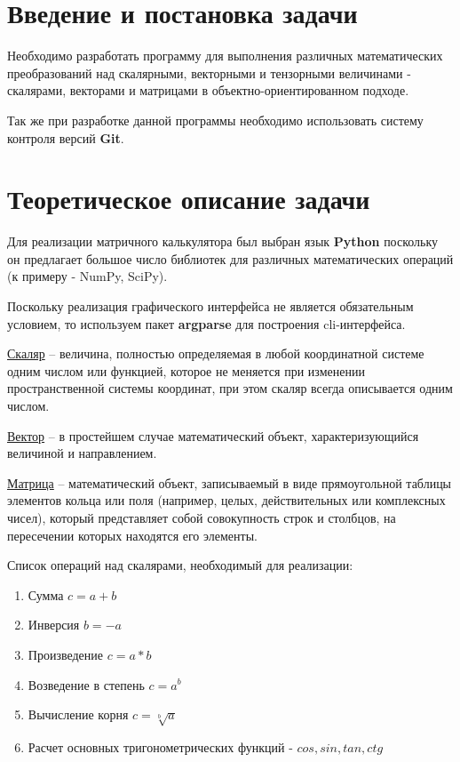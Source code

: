 \documentclass[a4paper,14pt]{extarticle}
\begin{document}
\section{Введение и постановка задачи}
Необходимо разработать программу для выполнения различных математических преобразований над скалярными, векторными и тензорными величинами - скалярами, векторами и матрицами в объектно-ориентированном подходе.

Так же при разработке данной программы необходимо использовать систему контроля версий \textbf{Git}.

\section{Теоретическое описание задачи}
Для реализации матричного калькулятора был выбран язык \textbf{Python} поскольку он предлагает большое число библиотек для различных математических операций (к примеру - NumPy, SciPy).

Поскольку реализация графического интерфейса не является обязательным условием, 
то используем пакет \textbf{argparse} для построения cli-интерфейса. 

\href{https://ru.wikipedia.org/wiki/%D0%A1%D0%BA%D0%B0%D0%BB%D1%8F%D1%80}{Скаляр} 
-- величина, полностью определяемая в любой координатной системе одним числом или функцией, которое не меняется при изменении пространственной системы координат, при этом скаляр всегда описывается одним числом.

\href{https://ru.wikipedia.org/wiki/%D0%92%D0%B5%D0%BA%D1%82%D0%BE%D1%80_(%D0%BC%D0%B0%D1%82%D0%B5%D0%BC%D0%B0%D1%82%D0%B8%D0%BA%D0%B0)}{Вектор}
-- в простейшем случае математический объект, характеризующийся величиной и направлением.

\href{https://ru.wikipedia.org/wiki/%D0%9C%D0%B0%D1%82%D1%80%D0%B8%D1%86%D0%B0_(%D0%BC%D0%B0%D1%82%D0%B5%D0%BC%D0%B0%D1%82%D0%B8%D0%BA%D0%B0)}{Матрица}
-- математический объект, записываемый в виде прямоугольной таблицы элементов кольца или поля (например, целых, действительных или комплексных чисел), который представляет собой совокупность строк и столбцов, на пересечении которых находятся его элементы.

\vspace{0.1cm}

Список операций над скалярами, необходимый для реализации:
\begin{enumerate}
	\item Сумма $c = a + b$
	\item Инверсия $b = -a$
	\item Произведение $c = a * b$
	\item Возведение в степень $c = a^b$
	\item Вычисление корня $c = \sqrt[b]{a}$
	\item Расчет основных тригонометрических функций - $cos, sin, tan, ctg$
\end{enumerate}
\end{document}
